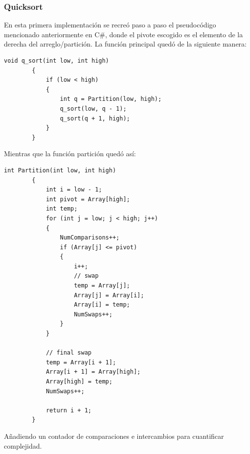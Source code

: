 \documentclass[conference]{IEEEtran}
\begin{document}
\subsubsection{Quicksort}
En esta primera implementación se recreó paso a paso el pseudocódigo mencionado anteriormente en C\#, donde el pivote escogido es el elemento de la derecha del arreglo/partición.
La función principal quedó de la siguiente manera:


\begin{verbatim}
void q_sort(int low, int high)
        {
            if (low < high)
            {
                int q = Partition(low, high);
                q_sort(low, q - 1);
                q_sort(q + 1, high);
            }
        }
\end{verbatim}

Mientras que la función partición quedó así:

\begin{verbatim}
int Partition(int low, int high)
        {
            int i = low - 1;
            int pivot = Array[high];
            int temp;
            for (int j = low; j < high; j++)
            {
                NumComparisons++;
                if (Array[j] <= pivot)
                {
                    i++;
                    // swap
                    temp = Array[j];
                    Array[j] = Array[i];
                    Array[i] = temp;
                    NumSwaps++;
                }
            }

            // final swap
            temp = Array[i + 1];
            Array[i + 1] = Array[high];
            Array[high] = temp;
            NumSwaps++;

            return i + 1;
        }
\end{verbatim}

Añadiendo un contador de comparaciones e intercambios para cuantificar complejidad.
\end{document}
